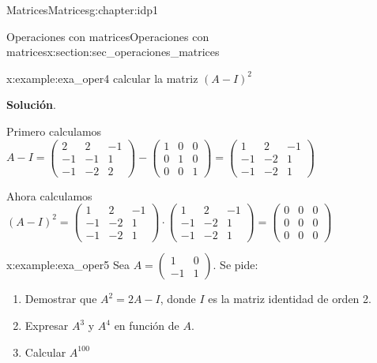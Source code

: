 \documentclass[oneside,12pt,]{book}
\newcommand{\blocktitlefont}{\relax}
\newcommand{\amp}{&}
\begin{document}
\begin{chapterptx}{Matrices}{}{Matrices}{}{}{g:chapter:idp1}
\begin{sectionptx}{Operaciones con matrices}{}{Operaciones con matrices}{}{}{x:section:sec_operaciones_matrices}
\begin{example}{}{x:example:exa_oper4}
calcular la matriz \((A-I)^2\)%
\par\smallskip%
\noindent\textbf{\blocktitlefont Solución}.\hypertarget{g:solution:idp12}{}\quad{}%
\par
Primero calculamos \(A-I=\begin{pmatrix}
2\amp2\amp-1 \\
-1\amp-1\amp1 \\
-1\amp-2\amp2
\end{pmatrix}
-
\begin{pmatrix}
1\amp0\amp0 \\
0\amp1\amp0 \\
0\amp0\amp1
\end{pmatrix}
=
\begin{pmatrix}
1 \amp 2 \amp -1 \\
-1\amp-2\amp1 \\
-1\amp-2 \amp 1
\end{pmatrix} \)%
\par
Ahora calculamos \((A-I)^2=\begin{pmatrix}
1 \amp 2 \amp -1 \\
-1\amp-2\amp1 \\
-1\amp-2 \amp 1
\end{pmatrix} 
\cdot
\begin{pmatrix}
1 \amp 2 \amp -1 \\
-1\amp-2\amp1 \\
-1\amp-2 \amp 1
\end{pmatrix} 
=
\begin{pmatrix}
0 \amp 0 \amp 0 \\
0\amp0\amp0 \\
0\amp0 \amp 0
\end{pmatrix} \)%
\end{example}
\begin{example}{}{x:example:exa_oper5}%
Sea \(A=\begin{pmatrix} 1 \amp 0 \\ -1 \amp 1 \end{pmatrix}\). Se pide:%
\par
%
\begin{enumerate}[label=\alph*]
\item{}Demostrar que \(A^2=2A-I\), donde \(I\) es la matriz identidad de orden 2.%
\item{}Expresar \(A^3\) y \(A^4\) en función de \(A\).%
\item{}Calcular \(A^{100}\)%
\end{enumerate}
%
\par\smallskip%

\end{example}
\end{sectionptx}
\end{chapterptx}
\end{document}
